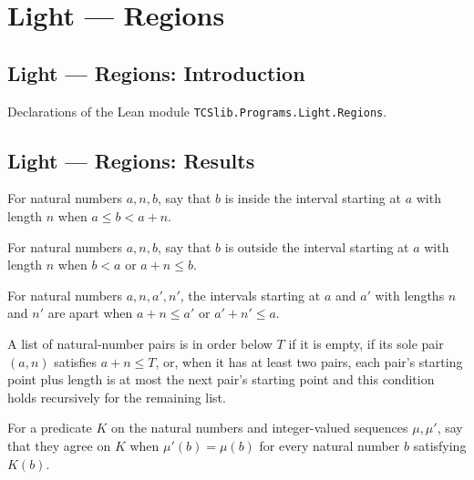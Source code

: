\section{Light --- Regions}
\subsection*{Light --- Regions: Introduction}

Declarations of the Lean module \texttt{TCSlib.Programs.Light.Regions}.

\subsection*{Light --- Regions: Results}

\begin{definition}
\label{Light.Inside}
\leanok
For natural numbers $a,n,b$, say that $b$ is inside the interval starting at $a$ with
length $n$ when $a\le b<a+n$.
\end{definition}

\begin{definition}
\label{Light.Outside}
\leanok
For natural numbers $a,n,b$, say that $b$ is outside the interval starting at $a$ with
length $n$ when $b<a$ or $a+n\le b$.
\end{definition}

\begin{definition}
\label{Light.Apart}
\leanok
For natural numbers $a,n,a',n'$, the intervals starting at $a$ and $a'$ with lengths $n$
and $n'$ are apart when $a+n\le a'$ or $a'+n'\le a$.
\end{definition}

\begin{definition}
\label{Light.InOrder}
\leanok
A list of natural-number pairs is in order below $T$ if it is empty, if its sole pair
$(a,n)$ satisfies $a+n\le T$, or, when it has at least two pairs, each pair's starting
point plus length is at most the next pair's starting point and this condition holds
recursively for the remaining list.
\end{definition}

\begin{definition}
\label{Light.SameOn}
\leanok
For a predicate $K$ on the natural numbers and integer-valued sequences $\mu,\mu'$, say
that they agree on $K$ when $\mu'(b)=\mu(b)$ for every natural number $b$ satisfying
$K(b)$.
\end{definition}

